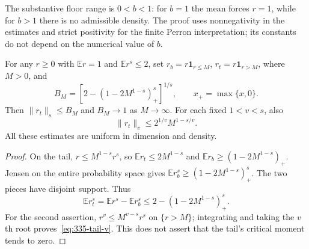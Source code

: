 The substantive floor range is $0<b<1$: for $b=1$ the mean forces
$r=1$, while for $b>1$ there is no admissible density. The proof uses
nonnegativity in the estimates and strict positivity for the finite Perron
interpretation; its constants do not depend on the numerical value of $b$.

\begin{lemma}
\label{lem:335-budget}
For any $r\ge0$ with $\mathbb E r=1$ and $\mathbb E r^s\le2$, set
$r_b=r\mathbf1_{r\le M}$, $r_t=r\mathbf1_{r>M}$, where $M>0$, and
\[
 B_M=\left[2-(1-2M^{1-s})_+^s\right]^{1/s},\qquad
 x_+=\max\{x,0\}.
\]
Then $\|r_t\|_s\le B_M$ and $B_M\to1$ as $M\to\infty$.
For each fixed $1<v<s$, also
\begin{equation}\label{eq:335-tail-v}
 \|r_t\|_v\le2^{1/v}M^{1-s/v}.
\end{equation}
All these estimates are uniform in dimension and density.
\end{lemma}
\begin{proof}
On the tail, $r\le M^{1-s}r^s$, so
$\mathbb E r_t\le2M^{1-s}$ and
$\mathbb E r_b\ge(1-2M^{1-s})_+$. Jensen on the entire probability
space gives $\mathbb E r_b^s\ge(1-2M^{1-s})_+^s$.
The two pieces have disjoint support. Thus
\[
 \mathbb E r_t^s=\mathbb E r^s-\mathbb E r_b^s
 \le2-(1-2M^{1-s})_+^s.
\]
For the second assertion, $r^v\le M^{v-s}r^s$ on $\{r>M\}$;
integrating and taking the $v$th root proves~\eqref{eq:335-tail-v}.
This does not assert that the tail's critical moment tends to zero.
\end{proof}

